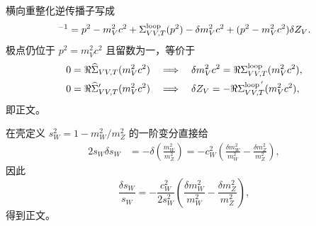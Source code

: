 \begin{derivation}
横向重整化逆传播子写成
\begin{equation*}
 [D_{V,T}(p^2)]^{-1}
 =p^2-m_V^2c^2+\Sigma_{VV,T}^{\rm loop}(p^2)
 -\delta m_V^2c^2+(p^2-m_V^2c^2)\delta Z_V.
\end{equation*}
极点仍位于 $p^2=m_V^2c^2$ 且留数为一，等价于
\begin{align*}
 0&=\Re\widehat\Sigma_{VV,T}(m_V^2c^2)
 \quad\Longrightarrow\quad
 \delta m_V^2c^2=\Re\Sigma_{VV,T}^{\rm loop}(m_V^2c^2),\\
 0&=\Re\widehat\Sigma'_{VV,T}(m_V^2c^2)
 \quad\Longrightarrow\quad
 \delta Z_V=-\Re\Sigma_{VV,T}^{{\rm loop}\,'}(m_V^2c^2),
\end{align*}
即正文。

在壳定义 $s_W^2=1-m_W^2/m_Z^2$ 的一阶变分直接给
\begin{align*}
 2s_W\delta s_W
 &= -\delta\!\left(\frac{m_W^2}{m_Z^2}\right)
 =-c_W^2\left(
 \frac{\delta m_W^2}{m_W^2}-\frac{\delta m_Z^2}{m_Z^2}
 \right),
\end{align*}
因此
\begin{equation*}
 \frac{\delta s_W}{s_W}
 =-\frac{c_W^2}{2s_W^2}
 \left(
 \frac{\delta m_W^2}{m_W^2}-\frac{\delta m_Z^2}{m_Z^2}
 \right),
\end{equation*}
得到正文。
\end{derivation}



